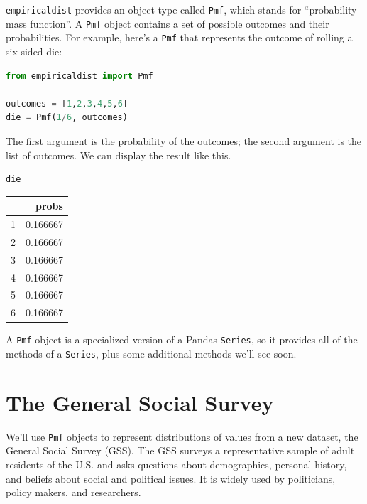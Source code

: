\passthrough{\lstinline!empiricaldist!} provides an object type called
\passthrough{\lstinline!Pmf!}, which stands for ``probability mass
function''. A \passthrough{\lstinline!Pmf!} object contains a set of
possible outcomes and their probabilities. For example, here's a
\passthrough{\lstinline!Pmf!} that represents the outcome of rolling a
six-sided die:

\begin{lstlisting}[language=Python,style=source]
from empiricaldist import Pmf

outcomes = [1,2,3,4,5,6]
die = Pmf(1/6, outcomes)
\end{lstlisting}

The first argument is the probability of the outcomes; the second
argument is the list of outcomes. We can display the result like this.

\begin{lstlisting}[language=Python,style=source]
die
\end{lstlisting}

\begin{tabular}{lr}
\midrule
 & probs \\
\midrule
1 & 0.166667 \\
2 & 0.166667 \\
3 & 0.166667 \\
4 & 0.166667 \\
5 & 0.166667 \\
6 & 0.166667 \\
\midrule
\end{tabular}

A \passthrough{\lstinline!Pmf!} object is a specialized version of a
Pandas \passthrough{\lstinline!Series!}, so it provides all of the
methods of a \passthrough{\lstinline!Series!}, plus some additional
methods we'll see soon.

\section{The General Social Survey}\label{the-general-social-survey}

We'll use \passthrough{\lstinline!Pmf!} objects to represent
distributions of values from a new dataset, the General Social Survey
(GSS). The GSS surveys a representative sample of adult residents of the
U.S. and asks questions about demographics, personal history, and
beliefs about social and political issues. It is widely used by
politicians, policy makers, and researchers.

